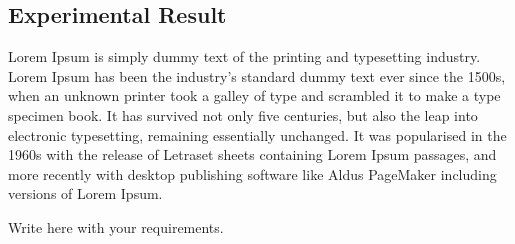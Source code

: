  

\newpage
\begin{center}
    \section{Experimental Result}
\end{center}
Lorem Ipsum is simply dummy text of the printing and typesetting industry. Lorem Ipsum has been the industry's standard dummy text ever since the 1500s, when an unknown printer took a galley of type and scrambled it to make a type specimen book. It has survived not only five centuries, but also the leap into electronic typesetting, remaining essentially unchanged. It was popularised in the 1960s with the release of Letraset sheets containing Lorem Ipsum passages, and more recently with desktop publishing software like Aldus PageMaker including versions of Lorem Ipsum.
	\vspace{3\baselineskip}
    \begin{center}
        \Large Write here with your requirements.
    \end{center}
	\vspace{3\baselineskip}



